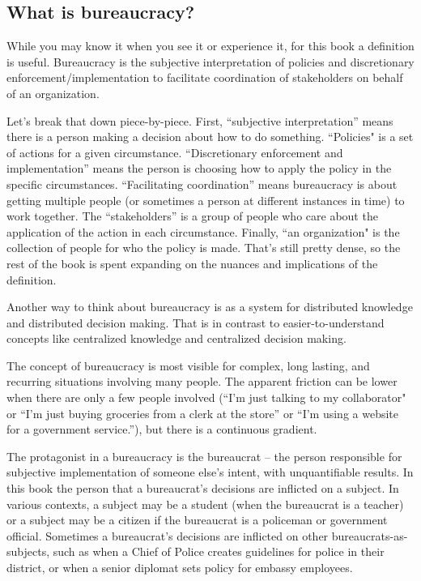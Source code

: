 \subsection{What is bureaucracy?}
While you may know it when you see it or experience it, for this book a definition is useful. 
\gls{Bureaucracy} is the subjective interpretation of policies and discretionary enforcement/implementation to facilitate coordination of stakeholders on behalf of an organization. 

Let's break that down piece-by-piece. First, ``subjective interpretation'' means there is a person making a decision about how to do something. ``Policies" is a set of actions for a given circumstance. ``Discretionary enforcement and implementation'' means the person is choosing how to apply the policy in the specific circumstances.  ``Facilitating coordination'' means bureaucracy is about getting multiple people (or sometimes a person at different instances in time) to work together. The ``stakeholders'' is a group of people who care about the application of the action in each circumstance. Finally, ``an \gls{organization}" is the collection of people for who the policy is made. That's still pretty dense, so the rest of the book is spent expanding on the nuances and implications of the definition.


Another way to think about bureaucracy is as a system for distributed knowledge and distributed decision making. That is in contrast to easier-to-understand concepts like centralized knowledge and centralized decision making. 

The concept of bureaucracy is most visible for complex, long lasting, and recurring situations involving many people. The apparent friction can be lower when there are only a few people involved (``I'm just talking to my collaborator" or ``I'm just buying groceries from a clerk at the store'' or ``I'm using a website for a government service.''), but there is a continuous gradient. 


The protagonist in a bureaucracy is the \gls{bureaucrat} -- the person responsible for subjective implementation of someone else's intent, with unquantifiable results. In this book the person that a bureaucrat's decisions are inflicted on a \gls{subject}. In various contexts, a subject may be a student (when the bureaucrat is a teacher) or a subject may be a citizen if the bureaucrat is a policeman or government official. Sometimes a bureaucrat's decisions are inflicted on other bureaucrats-as-subjects, such as when a Chief of Police creates guidelines for police in their district, or when a senior diplomat sets policy for embassy employees. 

